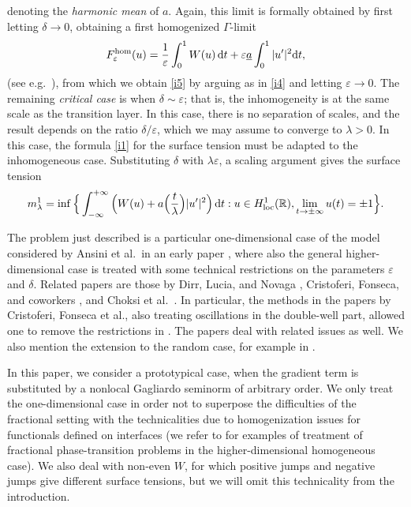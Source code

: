 \documentclass{article}
\theoremstyle{definition}
\newcommand{\de}{\mathrm{d}}
\newcommand{\e}{\varepsilon}
\def\e{\varepsilon}
\begin{document}
denoting the {\em harmonic mean} of $a$. Again, this limit is formally obtained by first letting $\delta\to 0$, obtaining 
a first homogenized $\Gamma$-limit 
\begin{equation*}
F^{\rm hom}_{\e}(u)= \frac1\e\int_0^1 W(u)\,\de t+\e \underline a\int_0^1|u'|^2\de t,
\end{equation*}
(see e.g.~\cite{Hom_mult_int}), from which we obtain \eqref{i5} by arguing as in \eqref{i4} and  letting $\e\to 0$. The remaining {\em critical case} is when $\delta\sim\e$; that is, the inhomogeneity is at the same scale as the transition layer. In this case, there is no separation of scales, and the result depends on the ratio
$\delta/\e$, which we may assume to converge to $\lambda>0$. In this case, the formula \eqref{i1} for the surface tension must be adapted to the inhomogeneous case. Substituting $\delta$ with $\lambda\e$, a scaling argument gives the surface tension
\begin{equation*}
m^1_\lambda= \inf\Big\{\int_{-\infty}^{+\infty} \Big(W(u)+a\Big(\frac{t}\lambda\Big)|u'|^2\Big)\,\de t: u\in H^1_{\rm loc}(\mathbb R), \lim_{t\to \pm \infty} u(t)=\pm1
\Big\}.
\end{equation*}

The problem just described is a particular one-dimensional case of the model considered by Ansini et al.~in an early paper \cite{Ansini_Braides_Chiado_2003}, where also the general higher-dimensional case is treated with some technical restrictions on the parameters $\e$ and $\delta$.
Related papers are those by Dirr, Lucia, and Novaga \cite{MR2231252,MR2463798}, Cristoferi, Fonseca, and coworkers \cite{MR4633768,MR4898688,MR4014392}, and Choksi et al.~\cite{MR4404852}. In particular, the methods in the papers by Cristoferi, Fonseca et al., also treating oscillations in the double-well part, allowed one to remove the restrictions in \cite{Ansini_Braides_Chiado_2003}.  The papers \cite{MR3883579,MR4955662,MR2679586,MR4409821,MR4905549,MR4179805,MR4280521,MR4419610,MR4668552,MR4941931} deal with related issues as well. We also mention the extension to the random case, for example in \cite{MR2515785,MR4598800}.

\bigskip
In this paper, we consider a prototypical case, when the gradient term is substituted by a nonlocal Gagliardo seminorm of arbitrary order. We only treat the one-dimensional case in order not to superpose the difficulties of the fractional setting with the technicalities due to homogenization issues for functionals defined on interfaces \cite{MR1070482} (we refer to \cite{MR3748585, Braides-Oleinik-Picerni} for examples of treatment of fractional phase-transition problems in the higher-dimensional homogeneous case). We also deal with non-even $W$, for which positive jumps and negative jumps give different surface tensions, but we will omit this technicality from the introduction.
\end{document}
